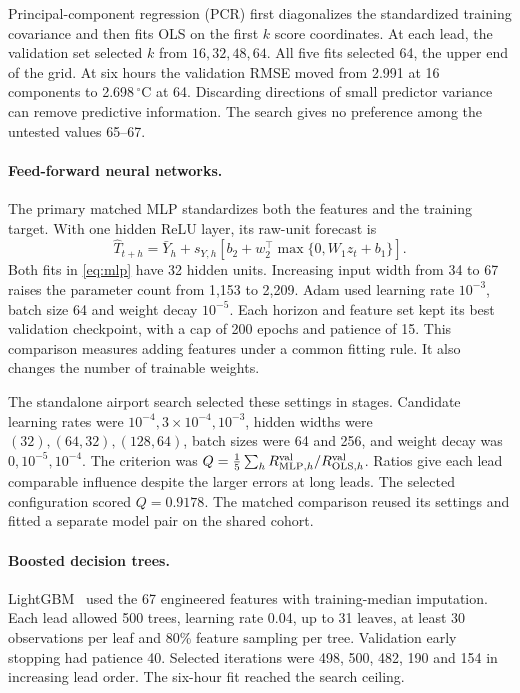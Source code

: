 \documentclass[11pt,letterpaper]{article}
\newcommand{\celsius}{\ensuremath{^{\circ}\mathrm{C}}}\newcommand{\code}[1]{\texttt{\small #1}}
\begin{document}
Principal-component regression (PCR) first diagonalizes the standardized training covariance and then fits OLS on the first $k$ score coordinates. At each lead, the validation set selected $k$ from $16,32,48,64$. All five fits selected 64, the upper end of the grid. At six hours the validation RMSE moved from 2.991 at 16 components to 2.698\,\celsius{} at 64. Discarding directions of small predictor variance can remove predictive information. The search gives no preference among the untested values 65--67.

\paragraph{Feed-forward neural networks.}
The primary matched MLP standardizes both the features and the training target. With one hidden ReLU layer, its raw-unit forecast is
\begin{equation}\label{eq:mlp}
 \widehat T_{t+h}=\bar Y_h+s_{Y,h}\left[b_2+w_2^\top\max\{0,W_1z_t+b_1\}\right].
\end{equation}
Both fits in \eqref{eq:mlp} have 32 hidden units. Increasing input width from 34 to 67 raises the parameter count from 1,153 to 2,209. Adam used learning rate $10^{-3}$, batch size 64 and weight decay $10^{-5}$. Each horizon and feature set kept its best validation checkpoint, with a cap of 200 epochs and patience of 15. This comparison measures adding features under a common fitting rule. It also changes the number of trainable weights.

The standalone airport search selected these settings in stages. Candidate learning rates were $10^{-4},3\times10^{-4},10^{-3}$, hidden widths were $(32),(64,32),(128,64)$, batch sizes were 64 and 256, and weight decay was $0,10^{-5},10^{-4}$. The criterion was $Q=\frac15\sum_h R_{\text{MLP},h}^{\rm val}/R_{\text{OLS},h}^{\rm val}$. Ratios give each lead comparable influence despite the larger errors at long leads. The selected configuration scored $Q=0.9178$. The matched comparison reused its settings and fitted a separate model pair on the shared cohort.

\paragraph{Boosted decision trees.}
LightGBM~\cite{lightgbm} used the 67 engineered features with training-median imputation. Each lead allowed 500 trees, learning rate 0.04, up to 31 leaves, at least 30 observations per leaf and 80\% feature sampling per tree. Validation early stopping had patience 40. Selected iterations were 498, 500, 482, 190 and 154 in increasing lead order. The six-hour fit reached the search ceiling.
\end{document}
